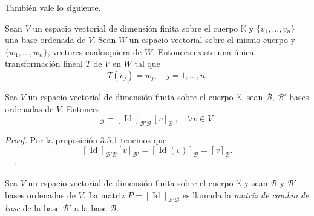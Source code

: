 \documentclass[handout]{beamer} %
\newcommand{\Id}{\operatorname{Id}}
\newcommand{\K}{\mathbb K}
\begin{document}
\begin{frame}
	\pause
También vale  lo siguiente.
\pause
\begin{teorema}\label{th-tl-definida-en-base}
	Sean $V$ un espacio vectorial de dimensión finita sobre el cuerpo $\K$ y $\{v_1,\ldots,v_n\}$  una base ordenada de $V$. Sean $W$ un espacio vectorial sobre el mismo cuerpo y $\{w_1,\ldots,w_n\}$, vectores cualesquiera de $W$. Entonces existe una única transformación  lineal $T$ de $V$ en $W$ tal que
	\begin{equation*}
	T(v_j) = w_j, \quad j=1,\ldots,n.
	\end{equation*}
\end{teorema}

\end{frame}

\begin{frame}
	\begin{corolario}\label{cor-cambio-de-base}
		Sea $V$ un espacio vectorial de dimensión finita sobre el cuerpo $\K$, sean $\mathcal B$, $\mathcal B'$  bases ordenadas de $V$. Entonces 
		\begin{equation*}
			[v]_{\mathcal B} = [\Id]_{\mathcal B' \mathcal B}\, [v]_{\mathcal B'}, \quad \forall v \in V.
		\end{equation*}
	\end{corolario}\pause
	\begin{proof}\pause
		Por la proposición 3.5.1 tenemos que 
		$$
		[\Id]_{\mathcal B' \mathcal B}  [v]_{\mathcal B'} = [\Id (v)]_{\mathcal B} = [v]_{\mathcal B}.
		$$
	\end{proof}
	\pause
	\begin{definicion}
		Sea $V$ un espacio vectorial de dimensión finita sobre el cuerpo $\K$ y sean $\mathcal B$ y $\mathcal B'$ bases ordenadas de $V$. La matriz $P =[\Id]_{\mathcal B' \mathcal B}$  es llamada la \textit{matriz de cambio de base}  de la base $\mathcal B'$  a la base $\mathcal B$. 
	\end{definicion}

	

\end{frame}
\end{document}
